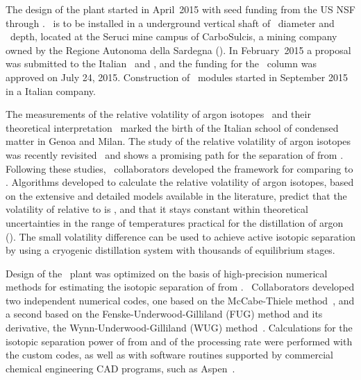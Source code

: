 The design of the plant started in April~2015 with seed funding from the US NSF through .  \Aria\ is to be installed in a underground  vertical shaft of  \AriaMonteSinniDiameter\ diameter and \AriaSeruciHeight\ depth,  located at the Seruci mine campus of CarboSulcis, a mining company owned by the Regione Autonoma della Sardegna (\RAS).  In February~2015 a proposal was submitted to the Italian \INFN\ and \RAS, and the funding for the \SeruciOne\ column was approved on July 24, 2015.  Construction of \SeruciOne\ modules started in September 2015 in a Italian company.    

The measurements of the relative volatility of argon isotopes~\cite{Boato:1962hg,Boato:1961hb,Boato:1959bn} and their theoretical interpretation~\cite{Casanova:1964gm,Casanova:1960dj,Fieschi:1961cd} marked the birth of the Italian school of condensed matter in Genoa and Milan.  The study of the relative volatility of argon isotopes was recently revisited~\cite{CanongiaLopes:2003ju,Calado:2000iq} and shows a promising path for the separation of  from .  Following these studies, \DS\ collaborators developed the framework for comparing  to .  Algorithms developed to calculate the relative volatility of argon isotopes, based on the extensive and detailed models available in the literature, predict that the volatility of  relative to  is \AriaArVolatiityRatio, and that it stays constant within theoretical uncertainties in the range of temperatures practical for the distillation of argon (\AriaArDistillationTemperatureRange).  The small volatility difference can be used to achieve active isotopic separation by using a cryogenic distillation system with thousands of equilibrium stages.

Design of the \Aria\ plant was optimized on the basis of high-precision numerical methods for estimating the isotopic separation of  from .  \DS\ Collaborators developed two independent numerical codes, one based on the McCabe-Thiele method~\cite{McCabe:1925be}, and a second based on the Fenske-Underwood-Gilliland (FUG) method and its derivative, the Wynn-Underwood-Gilliland (WUG) method~\cite{Underwood:1949dw,Gilliland:1940ja,Fenske:1932do}.  Calculations for the isotopic separation power of  from  and of the processing rate were performed with the custom codes, as well as with software routines supported by commercial chemical engineering CAD programs, such as Aspen~\cite{AspenTechnologyInc:2015ux}.

